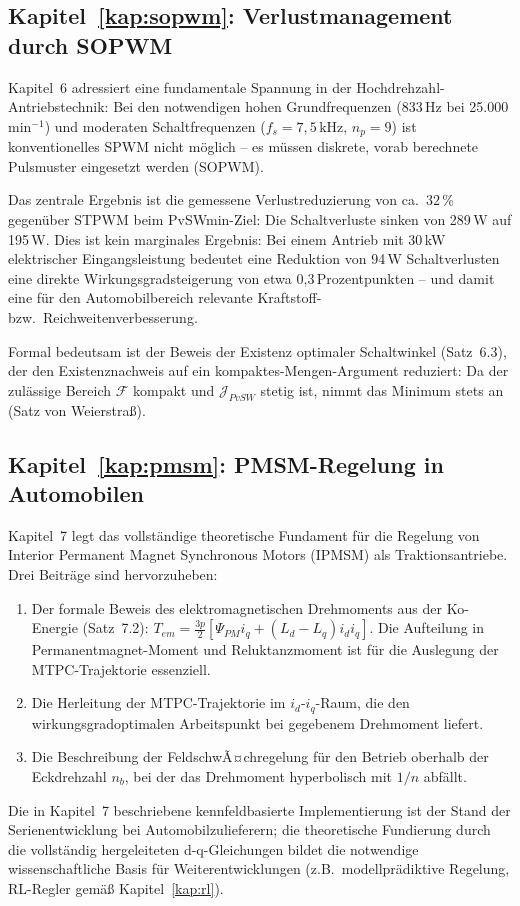 ﻿\documentclass[a4paper,12pt,openany,oneside]{book}
\newcommand{\unterabschnitt}[1]{\subsection{#1}}
\theoremstyle{definition}
\begin{document}
\unterabschnitt{Kapitel~\ref{kap:sopwm}: Verlustmanagement durch SOPWM}

Kapitel~6 adressiert eine fundamentale Spannung in der Hochdrehzahl-Antriebstechnik:
Bei den notwendigen hohen Grundfrequenzen (833\,Hz bei 25.000\,min$^{-1}$) und
moderaten Schaltfrequenzen ($f_s = 7{,}5\,\mathrm{kHz}$, $n_p = 9$) ist konventionelles
SPWM nicht m\"oglich -- es m\"ussen diskrete, vorab berechnete Pulsmuster eingesetzt
werden (SOPWM).

Das zentrale Ergebnis ist die gemessene Verlustreduzierung von ca.\ $32\,\%$ gegen\"uber
STPWM beim PvSWmin-Ziel: Die Schaltverluste sinken von 289\,W auf 195\,W. Dies ist
kein marginales Ergebnis: Bei einem Antrieb mit 30\,kW elektrischer Eingangsleistung
bedeutet eine Reduktion von 94\,W Schaltverlusten eine direkte Wirkungsgrad\-steigerung
von etwa 0{,}3\,Prozentpunkten -- und damit eine f\"ur den Automobilbereich relevante
Kraftstoff- bzw.\ Reichweitenverbesserung.

Formal bedeutsam ist der Beweis der Existenz optimaler Schaltwinkel (Satz~6.3),
der den Existenznachweis auf ein kompaktes-Mengen-Argument reduziert: Da der
zul\"assige Bereich $\mathcal{F}$ kompakt und $\mathcal{J}_{PvSW}$ stetig ist,
nimmt das Minimum stets an (Satz von Weierstra\ss{}).

\unterabschnitt{Kapitel~\ref{kap:pmsm}: PMSM-Regelung in Automobilen}

Kapitel~7 legt das vollst\"andige theoretische Fundament f\"ur die Regelung von
Interior Permanent Magnet Synchronous Motors (IPMSM) als Traktionsantriebe. Drei
Beitr\"age sind hervorzuheben:

\begin{enumerate}
  \item Der formale Beweis des elektromagnetischen Drehmoments aus der Ko-Energie
    (Satz~7.2): $T_{em} = \frac{3p}{2}[\Psi_{PM} i_q + (L_d-L_q) i_d i_q]$.
    Die Aufteilung in Permanent\-magnet-Moment und Reluktanzmoment ist f\"ur die
    Auslegung der MTPC-Trajektorie essenziell.
  \item Die Herleitung der MTPC-Trajektorie im $i_d$-$i_q$-Raum, die den
    wirkungsgradoptimalen Arbeitspunkt bei gegebenem Drehmoment liefert.
  \item Die Beschreibung der FeldschwÃ¤chregelung f\"ur den Betrieb oberhalb der
    Eckdrehzahl $n_b$, bei der das Drehmoment hyperbolisch mit $1/n$ abf\"allt.
\end{enumerate}

Die in Kapitel~7 beschriebene kennfeldbasierte Implementierung ist der Stand der
Serienentwicklung bei Automobilzulieferern; die theoretische Fundierung durch die
vollst\"andig hergeleiteten d-q-Gleichungen bildet die notwendige wissenschaftliche
Basis f\"ur Weiterentwicklungen (z.B.\ modellpr\"adiktive Regelung, RL-Regler gem\"a\ss{}
Kapitel~\ref{kap:rl}).
\end{document}
